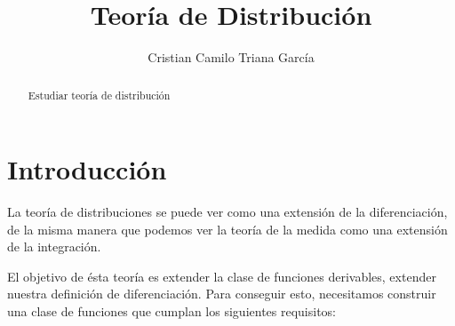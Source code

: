 \documentclass[letter,12pt]{article}
\title{Teoría de Distribución}
\author{Cristian Camilo Triana García}
\begin{document}
\maketitle

\begin{abstract}\normalsize
Estudiar teoría de distribución
\end{abstract}




\section{Introducción}
La teoría de distribuciones se puede ver como una extensión de la diferenciación,
de la misma manera que podemos ver la teoría de la medida como una extensión de la
integración.

El objetivo de ésta teoría es extender la clase de funciones derivables, extender
nuestra definición de diferenciación. Para conseguir esto, necesitamos construir
una clase de funciones que cumplan los siguientes requisitos:
\end{document}
